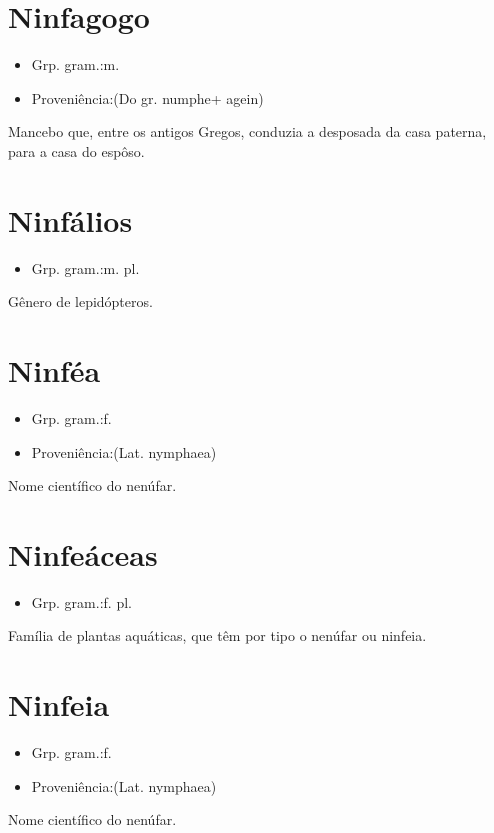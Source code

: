 \section{Ninfagogo}
\begin{itemize}
\item {Grp. gram.:m.}
\end{itemize}
\begin{itemize}
\item {Proveniência:(Do gr. \textunderscore numphe\textunderscore  + \textunderscore agein\textunderscore )}
\end{itemize}
Mancebo que, entre os antigos Gregos, conduzia a desposada da casa paterna, para a casa do espôso.
\section{Ninfálios}
\begin{itemize}
\item {Grp. gram.:m. pl.}
\end{itemize}
Gênero de lepidópteros.
\section{Ninféa}
\begin{itemize}
\item {Grp. gram.:f.}
\end{itemize}
\begin{itemize}
\item {Proveniência:(Lat. \textunderscore nymphaea\textunderscore )}
\end{itemize}
Nome científico do nenúfar.
\section{Ninfeáceas}
\begin{itemize}
\item {Grp. gram.:f. pl.}
\end{itemize}
Família de plantas aquáticas, que têm por tipo o nenúfar ou ninfeia.
\section{Ninfeia}
\begin{itemize}
\item {Grp. gram.:f.}
\end{itemize}
\begin{itemize}
\item {Proveniência:(Lat. \textunderscore nymphaea\textunderscore )}
\end{itemize}
Nome científico do nenúfar.
